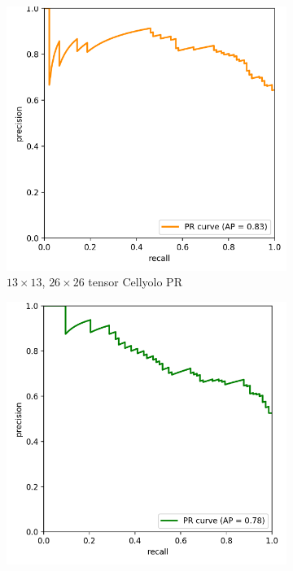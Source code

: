 \begin{figure}[h]
	\begin{center}
		\begin{subfigure}[b]{0.49\textwidth}
			\includegraphics[width=\textwidth]{thesis-template-master/images/2 tensor cellyolo PR on val dataset.png}
			\caption{$13 \times 13$, $26 \times 26$ tensor Cellyolo PR }
			\label{fig:res18}
		\end{subfigure}
		\begin{subfigure}[b]{0.49\textwidth}
		    \centering
			\includegraphics[width=\textwidth]{thesis-template-master/images/52 tensor cellyolo PR on val dataset.png}

\end{subfigure}
\end{center}
\end{figure}
